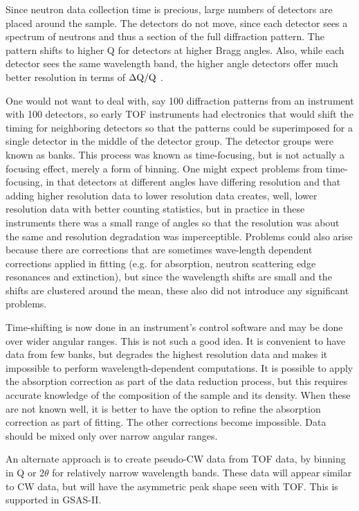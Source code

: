 Since neutron data collection time is precious, large numbers of detectors are placed around the sample. The detectors do not move, since each detector sees a spectrum of neutrons and thus a section of the full diffraction pattern. The pattern shifts to higher Q for detectors at higher Bragg angles. Also, while each detector sees the same wavelength band, the higher angle detectors offer much better resolution in terms of $\Delta\rm Q/\rm Q$ . 

One would not want to deal with, say 100 diffraction patterns from an instrument with 100 detectors, so early TOF instruments had electronics that would shift the timing for neighboring detectors so that the patterns could be superimposed for a single detector in the middle of the detector group. The detector groups were known as banks. This process was known as time-focusing, but is not actually a focusing effect, merely a form of binning. One might expect problems from time-focusing, in that detectors at different angles have differing resolution and that adding higher resolution data to lower resolution data creates, well, lower resolution data with better counting statistics, but in practice in these instruments there was a small range of angles so that the resolution was about the same and resolution degradation was imperceptible. Problems could also arise because there are corrections that are sometimes wave-length dependent corrections applied in fitting (e.g. for absorption, neutron scattering edge resonances and extinction), but since the wavelength shifts are small and the shifts are clustered around the mean, these also did not introduce any significant problems. 

Time-shifting is now done in an instrument's control software and may be done over wider angular ranges. This is not such a good idea. It is convenient to have data from few banks, but degrades the highest resolution data and makes it impossible to perform wavelength-dependent computations. It is possible to apply the absorption correction as part of the data reduction process, but this requires accurate knowledge of the composition of the sample and its density. When these are not known well, it is better to have the option to refine the absorption correction as part of fitting. The other corrections become impossible. Data should be mixed only over narrow angular ranges. 

An alternate approach is to create pseudo-CW data from TOF data, by binning in Q or $2\theta$ for relatively narrow wavelength bands. These data will appear similar to CW data, but will have the asymmetric peak shape seen with TOF. This is supported in GSAS-II. 

